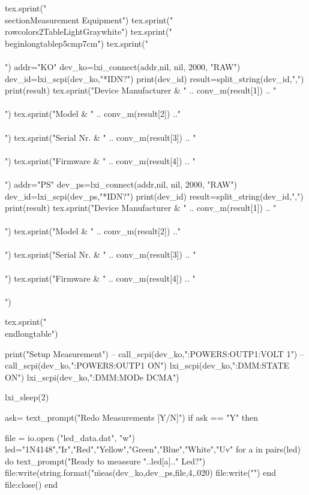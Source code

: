 \documentclass[a4paper,13pt]{article}
\begin{document}
\begin{luacode*}
  tex.sprint("\\section{Measurement Equipment}")
  tex.sprint("\\rowcolors{2}{TableLightGray}{white}")
  tex.sprint("\\begin{longtable}{p{5cm}p{7cm}}")
  tex.sprint("\\\\")
  addr="KO"
dev_ko=lxi_connect(addr,nil, nil, 2000, "RAW")
dev_id=lxi_scpi(dev_ko,"*IDN?")
print(dev_id)
result=split_string(dev_id,",")
print(result)
  tex.sprint("Device Manufacturer & " .. conv_m(result[1]) .. "\\\\")
  tex.sprint("Model & " .. conv_m(result[2]) .."\\\\")
  tex.sprint("Serial Nr. & " .. conv_m(result[3]) .. "\\\\")
  tex.sprint("Firmware & " .. conv_m(result[4]) .. "\\\\")
addr="PS"
dev_ps=lxi_connect(addr,nil, nil, 2000, "RAW")
dev_id=lxi_scpi(dev_ps,"*IDN?")
print(dev_id)
result=split_string(dev_id,",")
print(result)
  tex.sprint("Device Manufacturer & " .. conv_m(result[1]) .. "\\\\")
  tex.sprint("Model & " .. conv_m(result[2]) .."\\\\")
  tex.sprint("Serial Nr. & " .. conv_m(result[3]) .. "\\\\")
  tex.sprint("Firmware & " .. conv_m(result[4]) .. "\\\\")
  
  tex.sprint("\\end{longtable}")


  print("Setup Measurement")
 -- call_scpi(dev_ko,":POWERS:OUTP1:VOLT 1")
 -- call_scpi(dev_ko,":POWERS:OUTP1 ON")
  lxi_scpi(dev_ko,":DMM:STATE ON")
  lxi_scpi(dev_ko,":DMM:MODe DCMA")
 
  lxi_sleep(2)


 

     ask= text_prompt("Redo Measurements [Y/N]")
     if ask == "Y" then 
     
     file = io.open ("led_data.dat", "w")
     led={"1N4148","Ir","Red","Yellow","Green","Blue","White","Uv"}
     for a in pairs(led)
     do
     text_prompt("Ready to meassure "..led[a].." Led?")
     file:write(string.format("\"%
     meas(dev_ko,dev_ps,file,4,.020)
     file:write("\n\n")
     end
     file:close()
     end


\end{luacode*}
\end{document}
